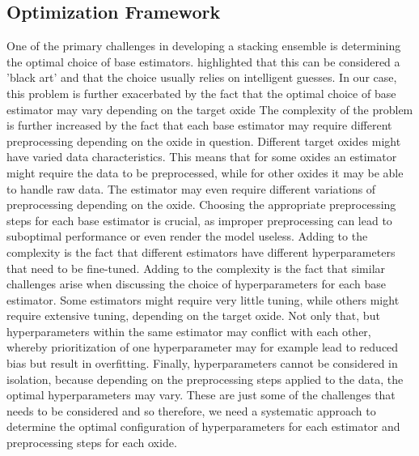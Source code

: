 \subsection{Optimization Framework}\label{sec:optimization_framework}
One of the primary challenges in developing a stacking ensemble is determining the optimal choice of base estimators.
\citet{wolpertstacked_1992} highlighted that this can be considered a 'black art' and that the choice usually relies on intelligent guesses.
In our case, this problem is further exacerbated by the fact that the optimal choice of base estimator may vary depending on the target oxide
The complexity of the problem is further increased by the fact that each base estimator may require different preprocessing depending on the oxide in question.
Different target oxides might have varied data characteristics.
This means that for some oxides an estimator might require the data to be preprocessed, while for other oxides it may be able to handle raw data.
The estimator may even require different variations of preprocessing depending on the oxide.
Choosing the appropriate preprocessing steps for each base estimator is crucial, as improper preprocessing can lead to suboptimal performance or even render the model useless.
Adding to the complexity is the fact that different estimators have different hyperparameters that need to be fine-tuned.
Adding to the complexity is the fact that similar challenges arise when discussing the choice of hyperparameters for each base estimator.
Some estimators might require very little tuning, while others might require extensive tuning, depending on the target oxide.
Not only that, but hyperparameters within the same estimator may conflict with each other, whereby prioritization of one hyperparameter may for example lead to reduced bias but result in overfitting.
Finally, hyperparameters cannot be considered in isolation, because depending on the preprocessing steps applied to the data, the optimal hyperparameters may vary.
These are just some of the challenges that needs to be considered and so therefore, we need a systematic approach to determine the optimal configuration of hyperparameters for each estimator and preprocessing steps for each oxide. 

